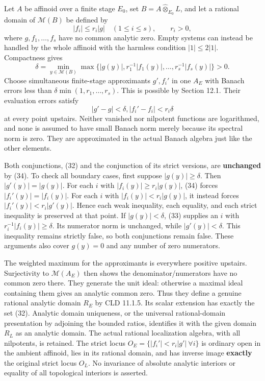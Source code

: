 \documentclass[
  11pt,
]{article}
\begin{document}
Let \(A\) be affinoid over a finite stage \(E_0\), set
\(B=A\widehat\otimes_{E_0}L\), and let a rational domain of
\(\mathcal M(B)\) be defined by \[
             |f_i|\le r_i|g|\quad(1\le i\le s),
             \qquad r_i>0,                              \tag{32}
\] where \(g,f_1,\ldots,f_s\) have no common analytic zero. Empty
systems can instead be handled by the whole affinoid with the harmless
condition \(|1|\le2|1|\). Compactness gives \[
 \delta=\min_{y\in\mathcal M(B)}
             \max\{|g(y)|,r_1^{-1}|f_1(y)|,\ldots,
                                  r_s^{-1}|f_s(y)|\}>0.
                                                               \tag{33}
\] Choose simultaneous finite-stage approximants \(g',f_i'\) in one
\(A_E\) with Banach errors less than \(\delta\min(1,r_1,\ldots,r_s)\).
This is possible by Section 12.1. Their evaluation errors satisfy \[
                 |g'-g|<\delta,
                 |f_i'-f_i|<r_i\delta                 \tag{34}
\] at every point upstairs. Neither vanished nor nilpotent functions are
logarithmed, and none is assumed to have small Banach norm merely
because its spectral norm is zero. They are approximated in the actual
Banach algebra just like the other elements.

Both conjunctions, (32) and the conjunction of its strict versions, are
\textbf{unchanged} by (34). To check all boundary cases, first suppose
\(|g(y)|\ge\delta\). Then \(|g'(y)|=|g(y)|\). For each \(i\) with
\(|f_i(y)|\ge r_i|g(y)|\), (34) forces \(|f_i'(y)|=|f_i(y)|\). For each
\(i\) with \(|f_i(y)|<r_i|g(y)|\), it instead forces
\(|f_i'(y)|<r_i|g'(y)|\). Hence each weak inequality, each equality, and
each strict inequality is preserved at that point. If \(|g(y)|<\delta\),
(33) supplies an \(i\) with \(r_i^{-1}|f_i(y)|\ge\delta\). Its numerator
norm is unchanged, while \(|g'(y)|<\delta\). This inequality remains
strictly false, so both conjunctions remain false. These arguments also
cover \(g(y)=0\) and any number of zero numerators.

The weighted maximum for the approximants is everywhere positive
upstairs. Surjectivity to \(\mathcal M(A_E)\) then shows the
denominator/numerators have no common zero there. They generate the unit
ideal: otherwise a maximal ideal containing them gives an analytic
common zero. Thus they define a genuine rational analytic domain \(R_E\)
by CLD 11.1.5. Its scalar extension has exactly the set (32). Analytic
domain uniqueness, or the universal rational-domain presentation by
adjoining the bounded ratios, identifies it with the given domain
\(R_L\) as an analytic domain. The actual rational localization algebra,
with all nilpotents, is retained. The strict locus
\(O_E=\{|f_i'|<r_i|g'|\ \forall i\}\) is ordinary open in the ambient
affinoid, lies in its rational domain, and has inverse image
\textbf{exactly} the original strict locus \(O_L\). No invariance of
absolute analytic interiors or equality of all topological interiors is
asserted.
\end{document}
